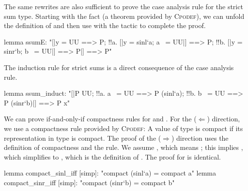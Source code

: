 The same rewrites are also sufficient to prove the case analysis rule for the strict sum type. Starting with the fact  (a theorem provided by \textsc{Cpodef}), we can unfold the definition of  and then use  with the  tactic to complete the proof.

\begin{isacode}
lemma ssumE: "[|y = UU ==> P;
  !!a. [|y = sinl`a; a ~= UU|] ==> P; !!b. [|y = sinr`b; b ~= UU|] ==> P|] ==> P"
\end{isacode}

\noindent
The induction rule for strict sums is a direct consequence of the case analysis rule.

\begin{isacode}
lemma ssum_induct:
  "[|P UU; !!a. a ~= UU ==> P (sinl`a); !!b. b ~= UU ==> P (sinr`b)|] ==> P x"
\end{isacode}

We can prove if-and-only-if compactness rules for  and . For the ($\Longleftarrow$) direction, we use a compactness rule provided by \textsc{Cpodef}: A value of type  is compact if its representation in type  is compact. The proof of the ($\Longrightarrow$) direction uses the definition of compactness and the  rule. We assume , which means ; this implies , which simplifies to , which is the definition of . The proof for  is identical.

\begin{isacodes}
lemma compact_sinl_iff [simp]: "compact (sinl`a) = compact a"
lemma compact_sinr_iff [simp]: "compact (sinr`b) = compact b"
\end{isacodes}
\unmedskip

